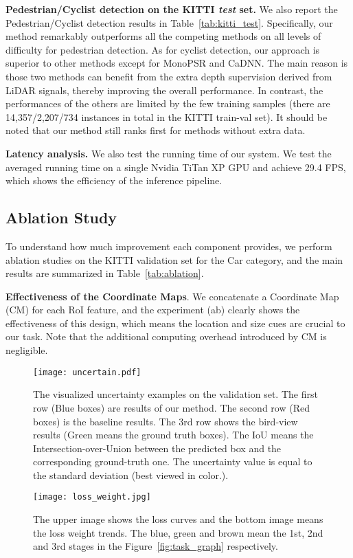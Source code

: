 \documentclass[10pt,twocolumn,letterpaper]{article}
\begin{document}
\noindent
{\bf Pedestrian/Cyclist detection on the KITTI \emph{test} set.}
We also report the Pedestrian/Cyclist detection results in Table~\ref{tab:kitti_test}. 
Specifically, our method remarkably outperforms all the competing methods on all levels of difficulty for pedestrian detection. 
As for cyclist detection, our approach is superior to other methods except for MonoPSR and CaDNN.
The main reason is those two methods can benefit from the extra depth supervision derived from LiDAR signals, thereby improving the overall performance.
In contrast, the performances of the others are limited by the few training samples (there are 14,357/2,207/734 instances in total in the KITTI train-val set).
It should be noted that our method still ranks first for methods without extra data.


\noindent
{\bf Latency analysis.}
We also test the running time of our system. We test the averaged running time on a single Nvidia TiTan XP GPU and achieve 29.4 FPS, which shows the efficiency of the inference pipeline. 


\subsection{Ablation Study} 
To understand how much improvement each component provides, we perform ablation studies on the KITTI validation set for the Car category, and the main results are summarized in Table~\ref{tab:ablation}. 

\noindent
{\bf Effectiveness of the Coordinate Maps}.
We concatenate a Coordinate Map (CM) for each RoI feature, and the experiment (ab) clearly shows the effectiveness of this design, which means the location and size cues are crucial to our task.
Note that the additional computing overhead introduced by CM is negligible.
\begin{figure*}[t]
\begin{center}
\texttt{[image: uncertain.pdf]}
\end{center}
   \caption{The visualized uncertainty examples on the validation set. The first row (\textcolor[RGB]{0,102,153}{Blue} boxes) are results of our method. The second row (\textcolor[RGB]{178,34,34}{Red} boxes) is the baseline results. The 3rd row shows the bird-view results (\textcolor[RGB]{50,205,50}{Green} means the ground truth boxes). The IoU means the Intersection-over-Union between the predicted box and the corresponding ground-truth one. The uncertainty value is equal to the standard deviation (best viewed in color.).}
\label{fig:uncertain}
\end{figure*}
\begin{figure}[t]
\begin{center}
\texttt{[image: loss\_weight.jpg]}
\end{center}
   \caption{The upper image shows the loss curves and the bottom image means the loss weight trends. The blue, green and brown mean the 1st, 2nd and 3rd stages in the Figure~\ref{fig:task_graph} respectively.}
\label{fig:loss_weight}
\end{figure}
\end{document}
